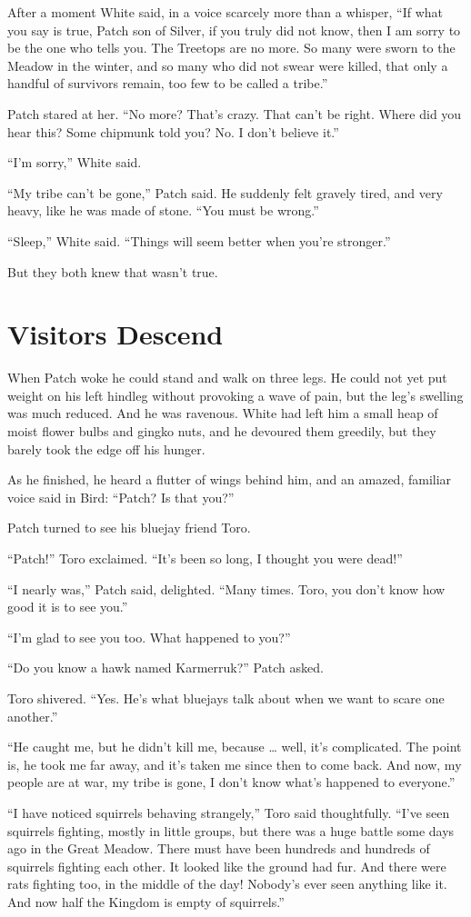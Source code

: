 \documentclass[ebook,oneside,openany,17pt]{memoir}
\renewcommand{\thechapter}{\Roman{chapter}}
\newcounter{sections}
\newcommand{\sections}[1]{%
  \section*{#1}
  \addtocounter{sections}{1}%
  \pdfbookmark[1]{#1}{section.\thechapter.\thesections}}
\begin{document}
After a moment White said, in a voice scarcely more than a whisper,
“If what you say is true, Patch son of Silver, if you truly did not
know, then I am sorry to be the one who tells you. The Treetops are no
more. So many were sworn to the Meadow in the winter, and so many who
did not swear were killed, that only a handful of survivors remain,
too few to be called a tribe.”

Patch stared at her. “No more? That’s crazy. That can’t be
right. Where did you hear this? Some chipmunk told you? No. I don’t
believe it.”

“I’m sorry,” White said.

“My tribe can’t be gone,” Patch said. He suddenly felt gravely tired,
and very heavy, like he was made of stone. “You must be wrong.”

“Sleep,” White said. “Things will seem better when you’re stronger.”

But they both knew that wasn’t true.


\sections{Visitors Descend}

When Patch woke he could stand and walk on three legs. He could not
yet put weight on his left hindleg without provoking a wave of pain,
but the leg’s swelling was much reduced. And he was ravenous. White
had left him a small heap of moist flower bulbs and gingko nuts, and
he devoured them greedily, but they barely took the edge off his
hunger.

As he finished, he heard a flutter of wings behind him, and an amazed,
familiar voice said in Bird: “Patch? Is that you?”

Patch turned to see his bluejay friend Toro.

“Patch!” Toro exclaimed. “It’s been so long, I thought you were dead!”

“I nearly was,” Patch said, delighted. “Many times. Toro, you don’t
know how good it is to see you.”

“I’m glad to see you too. What happened to you?”

“Do you know a hawk named Karmerruk?” Patch asked.

Toro shivered. “Yes. He’s what bluejays talk about when we want to
scare one another.”

“He caught me, but he didn’t kill me, because … well, it’s
complicated. The point is, he took me far away, and it’s taken me
since then to come back. And now, my people are at war, my tribe is
gone, I don’t know what’s happened to everyone.”

“I have noticed squirrels behaving strangely,” Toro said
thoughtfully. “I’ve seen squirrels fighting, mostly in little groups,
but there was a huge battle some days ago in the Great Meadow. There
must have been hundreds and hundreds of squirrels fighting each
other. It looked like the ground had fur. And there were rats fighting
too, in the middle of the day! Nobody’s ever seen anything like
it. And now half the Kingdom is empty of squirrels.”
\end{document}
